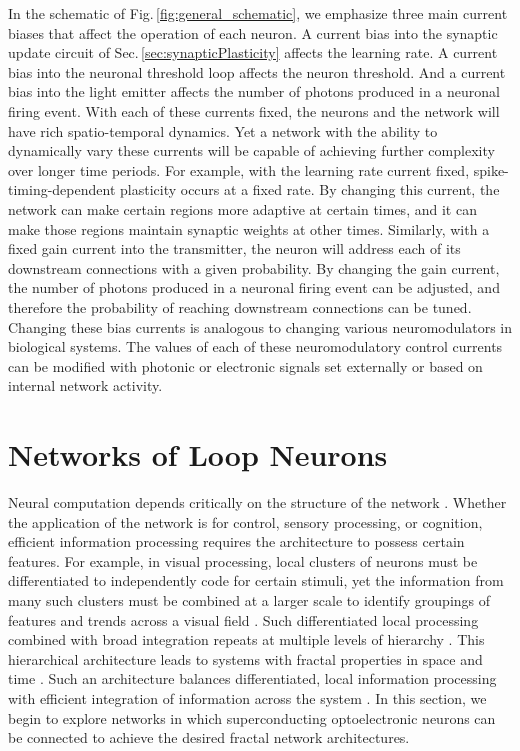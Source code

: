 \documentclass[twocolumn]{article}
\begin{document}
In the schematic of Fig.\,\ref{fig:general_schematic}, we emphasize three main current biases that affect the operation of each neuron. A current bias into the synaptic update circuit of Sec.\,\ref{sec:synapticPlasticity} affects the learning rate. A current bias into the neuronal threshold loop affects the neuron threshold. And a current bias into the light emitter affects the number of photons produced in a neuronal firing event. With each of these currents fixed, the neurons and the network will have rich spatio-temporal dynamics. Yet a network with the ability to dynamically vary these currents will be capable of achieving further complexity over longer time periods. For example, with the learning rate current fixed, spike-timing-dependent plasticity occurs at a fixed rate. By changing this current, the network can make certain regions more adaptive at certain times, and it can make those regions maintain synaptic weights at other times. Similarly, with a fixed gain current into the transmitter, the neuron will address each of its downstream connections with a given probability. By changing the gain current, the number of photons produced in a neuronal firing event can be adjusted, and therefore the probability of reaching downstream connections can be tuned. Changing these bias currents is analogous to changing various neuromodulators in biological systems. The values of each of these neuromodulatory control currents can be modified with photonic or electronic signals set externally or based on internal network activity.

\section{\label{sec:networks}Networks of Loop Neurons}
Neural computation depends critically on the structure of the network \cite{spto2000}. Whether the application of the network is for control, sensory processing, or cognition, efficient information processing requires the architecture to possess certain features. For example, in visual processing, local clusters of neurons must be differentiated to independently code for certain stimuli, yet the information from many such clusters must be combined at a larger scale to identify groupings of features and trends across a visual field \cite{haah2017}. Such differentiated local processing combined with broad integration repeats at multiple levels of hierarchy \cite{stsa2000,budr2004}. This hierarchical architecture leads to systems with fractal properties in space and time \cite{bu2006,busp2009}. Such an architecture balances differentiated, local information processing with efficient integration of information across the system \cite{to2004}. In this section, we begin to explore networks in which superconducting optoelectronic neurons can be connected to achieve the desired fractal network architectures.
\end{document}
